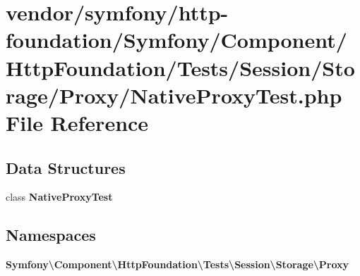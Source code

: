 \section{vendor/symfony/http-\/foundation/\+Symfony/\+Component/\+Http\+Foundation/\+Tests/\+Session/\+Storage/\+Proxy/\+Native\+Proxy\+Test.php File Reference}
\label{_native_proxy_test_8php}
\subsection*{Data Structures}
\begin{DoxyCompactItemize}
\item 
class {\bf Native\+Proxy\+Test}
\end{DoxyCompactItemize}
\subsection*{Namespaces}
\begin{DoxyCompactItemize}
\item 
 {\bf Symfony\textbackslash{}\+Component\textbackslash{}\+Http\+Foundation\textbackslash{}\+Tests\textbackslash{}\+Session\textbackslash{}\+Storage\textbackslash{}\+Proxy}
\end{DoxyCompactItemize}
